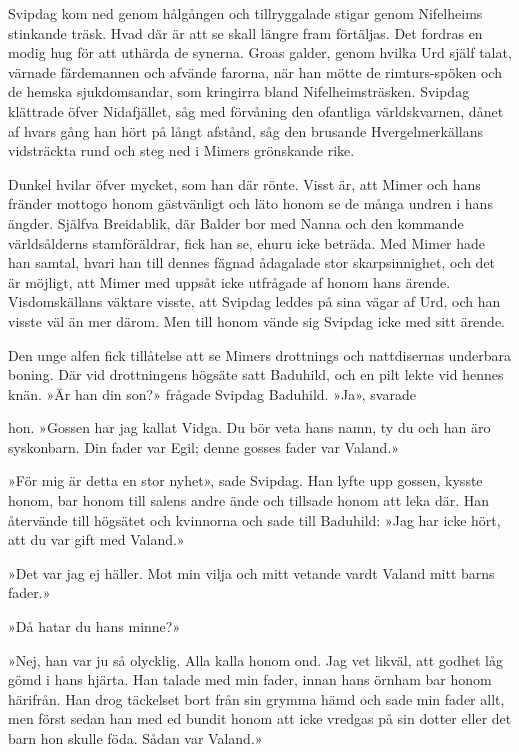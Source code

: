 Svipdag kom ned genom hålgången och tillryggalade stigar genom
Nifelheims stinkande träsk. Hvad där är att se skall längre fram
förtäljas. Det fordras en modig hug för att uthärda de synerna. Groas
galder, genom hvilka Urd själf talat, värnade färdemannen och afvände
farorna, när han mötte de rimturs-spöken och de hemska sjukdomsandar,
som kringirra bland Nifelheimsträsken. Svipdag klättrade öfver
Nidafjället, såg med förvåning den ofantliga världskvarnen, dånet af
hvars gång han hört på långt afstånd, såg den brusande Hvergelmerkällans
vidsträckta rund och steg ned i Mimers grönskande rike.

Dunkel hvilar öfver mycket, som han där rönte. Visst är, att Mimer och
hans fränder mottogo honom gästvänligt och läto honom se de många undren
i hans ängder. Själfva Breidablik, där Balder bor med Nanna och den
kommande världsålderns stamföräldrar, fick han se, ehuru icke beträda.
Med Mimer hade han samtal, hvari han till dennes fägnad ådagalade stor
skarpsinnighet, och det är möjligt, att Mimer med uppsåt icke utfrågade
af honom hans ärende. Visdomskällans väktare visste, att Svipdag leddes
på sina vägar af Urd, och han visste väl än mer därom. Men till honom
vände sig Svipdag icke med sitt ärende.

Den unge alfen fick tillåtelse att se Mimers drottnings och nattdisernas
underbara boning. Där vid drottningens högsäte satt Baduhild, och en
pilt lekte vid hennes knän. »Är han din son?» frågade Svipdag Baduhild.
»Ja», svarade

hon. »Gossen har jag kallat Vidga. Du bör veta hans namn, ty du och han
äro syskonbarn. Din fader var Egil; denne gosses fader var Valand.»

»För mig är detta en stor nyhet», sade Svipdag. Han lyfte upp gossen,
kysste honom, bar honom till salens andre ände och tillsade honom att
leka där. Han återvände till högsätet och kvinnorna och sade till
Baduhild: »Jag har icke hört, att du var gift med Valand.»

»Det var jag ej häller. Mot min vilja och mitt vetande vardt Valand mitt
barns fader.»

»Då hatar du hans minne?»

»Nej, han var ju så olycklig. Alla kalla honom ond. Jag vet likväl, att
godhet låg gömd i hans hjärta. Han talade med min fader, innan hans
örnham bar honom härifrån. Han drog täckelset bort från sin grymma hämd
och sade min fader allt, men först sedan han med ed bundit honom att
icke vredgas på sin dotter eller det barn hon skulle föda. Sådan var
Valand.»

